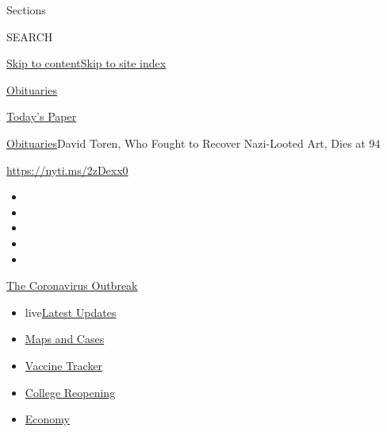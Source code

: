 Sections

SEARCH

\protect\hyperlink{site-content}{Skip to
content}\protect\hyperlink{site-index}{Skip to site index}

\href{https://www.nytimes.com/section/obituaries}{Obituaries}

\href{https://myaccount.nytimes.com/auth/login?response_type=cookie\&client_id=vi}{}

\href{https://www.nytimes.com/section/todayspaper}{Today's Paper}

\href{/section/obituaries}{Obituaries}\textbar{}David Toren, Who Fought
to Recover Nazi-Looted Art, Dies at 94

\url{https://nyti.ms/2zDexx0}

\begin{itemize}
\item
\item
\item
\item
\item
\end{itemize}

\href{https://www.nytimes.com/news-event/coronavirus?action=click\&pgtype=Article\&state=default\&region=TOP_BANNER\&context=storylines_menu}{The
Coronavirus Outbreak}

\begin{itemize}
\tightlist
\item
  live\href{https://www.nytimes.com/2020/08/03/world/coronavirus-covid-19.html?action=click\&pgtype=Article\&state=default\&region=TOP_BANNER\&context=storylines_menu}{Latest
  Updates}
\item
  \href{https://www.nytimes.com/interactive/2020/us/coronavirus-us-cases.html?action=click\&pgtype=Article\&state=default\&region=TOP_BANNER\&context=storylines_menu}{Maps
  and Cases}
\item
  \href{https://www.nytimes.com/interactive/2020/science/coronavirus-vaccine-tracker.html?action=click\&pgtype=Article\&state=default\&region=TOP_BANNER\&context=storylines_menu}{Vaccine
  Tracker}
\item
  \href{https://www.nytimes.com/2020/08/02/us/covid-college-reopening.html?action=click\&pgtype=Article\&state=default\&region=TOP_BANNER\&context=storylines_menu}{College
  Reopening}
\item
  \href{https://www.nytimes.com/live/2020/08/03/business/stock-market-today-coronavirus?action=click\&pgtype=Article\&state=default\&region=TOP_BANNER\&context=storylines_menu}{Economy}
\end{itemize}

